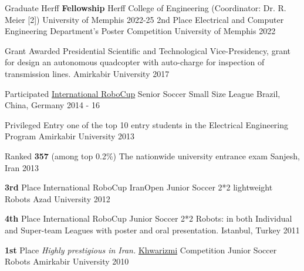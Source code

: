 
\begin{cvhonors}

  \cvhonor
  {Graduate Herff \textbf{Fellowship}}
  {Herff College of Engineering (Coordinator: Dr. R. Meier [2])}
  {University of Memphis}
  {2022-25}
  \cvhonor
    {2nd Place}
        {Electrical and Computer Engineering Department's Poster Competition}
    {University of Memphis}
	{2022}

  \cvhonor
    {Grant Awarded} %
    {Presidential Scientific and Technological Vice-Presidency, grant for design an autonomous quadcopter with auto-charge for inspection of transmission lines.} %
    {Amirkabir University} %
    {2017} %

      \cvhonor
    {Participated}
    {\href{https://en.wikipedia.org/wiki/RoboCup}{International RoboCup} Senior Soccer Small Size League}
    {Brazil, China, Germany}
	{2014 - 16}

    \cvhonor
     {Privileged Entry}
     {one of the top 10 entry students in the Electrical Engineering Program}
     {Amirkabir University}
     {2013}

    \cvhonor
     {Ranked \textbf{357} (among top 0.2\%)}
     {The nationwide university entrance exam}
     {Sanjesh, Iran}
     {2013}
 
  \cvhonor
      {\textbf{3rd} Place}
      {International RoboCup IranOpen Junior Soccer 2*2 lightweight Robots}
      { Azad University}
        {2012}
        
   \cvhonor
   {\textbf{4th} Place}
    {International RoboCup Junior Soccer 2*2 Robots: in both Individual and Super-team Leagues with poster and oral presentation.}
    {Istanbul, Turkey}
	{2011}

    
  \cvhonor
  {\textbf{1st} Place}
  {\textit{Highly prestigious in Iran.}  \href{https://en.wikipedia.org/wiki/Khwarizmi_International_Award}{Khwarizmi} Competition Junior Soccer Robots}
  {Amirkabir University}
	{2010}
\end{cvhonors}


